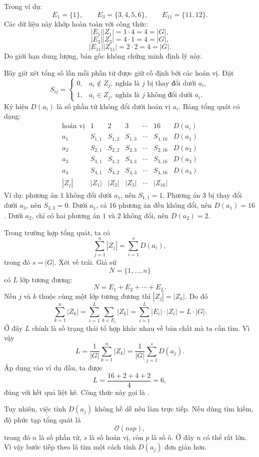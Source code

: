 \documentclass[11pt]{article}
\begin{document}
Trong ví dụ:
\[
  E_1=\{1\},\qquad E_3=\{3,4,5,6\},\qquad E_{11}=\{11,12\}.
\]
Các dữ liệu này khớp hoàn toàn với công thức:
\[
  |E_1||Z_1|=1\cdot4=4=|G|,
\]
\[
  |E_3||Z_3|=4\cdot1=4=|G|,
\]
\[
  |E_{11}||Z_{11}|=2\cdot2=4=|G|.
\]
Do giới hạn dung lượng, bản gốc không chứng minh định lý này.

Bây giờ xét tổng số lần mỗi phần tử được giữ cố định bởi các hoán vị. Đặt
\[
  S_{ij}=
  \begin{cases}
    0, & a_i\notin Z_j,\ \text{nghĩa là } j \text{ bị thay đổi dưới } a_i,\\
    1, & a_i\in Z_j,\ \text{nghĩa là } j \text{ không đổi dưới } a_i.
  \end{cases}
\]
Ký hiệu \(D(a_i)\) là số phần tử không đổi dưới hoán vị \(a_i\). Bảng tổng
quát có dạng:
\[
\begin{array}{c|ccccc|c}
\text{hoán vị} & 1 & 2 & 3 & \cdots & 16 & D(a_i)\\ \hline
a_1 & S_{1,1} & S_{1,2} & S_{1,3} & \cdots & S_{1,16} & D(a_1)\\
a_2 & S_{2,1} & S_{2,2} & S_{2,3} & \cdots & S_{2,16} & D(a_2)\\
a_3 & S_{3,1} & S_{3,2} & S_{3,3} & \cdots & S_{3,16} & D(a_3)\\
a_4 & S_{4,1} & S_{4,2} & S_{4,3} & \cdots & S_{4,16} & D(a_4)\\ \hline
|Z_j| & |Z_1| & |Z_2| & |Z_3| & \cdots & |Z_{16}| &
\end{array}
\]
Ví dụ: phương án \(1\) không đổi dưới \(a_1\), nên \(S_{1,1}=1\). Phương án
\(3\) bị thay đổi dưới \(a_3\), nên \(S_{3,3}=0\). Dưới \(a_1\), cả \(16\)
phương án đều không đổi, nên \(D(a_1)=16\). Dưới \(a_2\), chỉ có hai phương
án \(1\) và \(2\) không đổi, nên \(D(a_2)=2\).

Trong trường hợp tổng quát, ta có
\[
  \sum_{j=1}^{n}|Z_j|=\sum_{i=1}^{s}D(a_i),
\]
trong đó \(s=|G|\). Xét vế trái. Giả sử
\[
  N=\{1,\ldots,n\}
\]
có \(L\) lớp tương đương:
\[
  N=E_1+E_2+\cdots+E_L.
\]
Nếu \(j\) và \(k\) thuộc cùng một lớp tương đương thì \(|Z_j|=|Z_k|\). Do đó
\[
  \sum_{k=1}^{n}|Z_k|
  =\sum_{i=1}^{L}\sum_{k\in E_i}|Z_k|
  =\sum_{i=1}^{L}|E_i|\cdot |Z_i|
  =L\cdot |G|.
\]
Ở đây \(L\) chính là số trạng thái tổ hợp khác nhau về bản chất mà ta cần
tìm. Vì vậy
\[
  L=\frac{1}{|G|}\sum_{k=1}^{n}|Z_k|
   =\frac{1}{|G|}\sum_{j=1}^{s}D(a_j).
\]
Áp dụng vào ví dụ đầu, ta được
\[
  L=\frac{16+2+4+2}{4}=6,
\]
đúng với kết quả liệt kê. Công thức này gọi là .

Tuy nhiên, việc tính \(D(a_j)\) không hề dễ nếu làm trực tiếp. Nếu dùng tìm
kiếm, độ phức tạp tổng quát là
\[
  \mathcal{O}(nsp),
\]
trong đó \(n\) là số phần tử, \(s\) là số hoán vị, còn \(p\) là số ô. Ở đây
\(n\) có thể rất lớn. Vì vậy bước tiếp theo là tìm một cách tính \(D(a_j)\)
đơn giản hơn.
\end{document}
